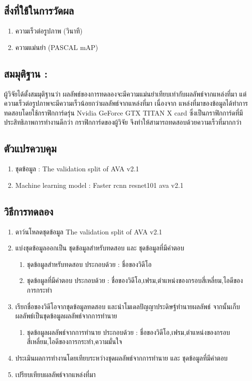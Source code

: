 \subsection*{สิ่งที่ใช้ในการวัดผล}
	\begin{enumerate}
		\item ความเร็วต่อรูปภาพ (วินาที)
		\item ความแม่นยำ (PASCAL mAP)
	\end{enumerate}
\subsection*{สมมุติฐาน :}ผู้วิจัยได้ตั้งสมมุติฐานว่า ผลลัพธ์ของการทดลองจะมีความแม่นยำเทียบเท่ากับผลลัพธ์จากแหล่งที่มา แต่ความเร็วต่อรูปภาพจะมีความเร็วน้อยกว่าผลลัพธ์จากแหล่งที่มา เนื่องจาก แหล่งที่มาของข้อมูลได้ทำการทดสอบโดยใช้กราฟิกการ์ดรุ่น Nvidia GeForce GTX TITAN X card ซึ่งเป็นกราฟิกการ์ดที่มีประสิทธิภาพการทำงานดีกว่า กราฟิกการ์ดของผู้วิจัย จึงทำให้สามารถทดสอบด้วยความเร็วที่มากกว่า
\subsection*{ตัวแปรควบคุม}
	\begin{enumerate}
		\item ชุดข้อมูล : The validation split of AVA v2.1
		\item Machine learning model : Faster rcnn resnet101 ava v2.1
	\end{enumerate}
\subsection*{วิธีการทดลอง}
	\begin{enumerate}
		\item ดาว์นโหลดชุดข้อมูล The validation split of AVA v2.1
		\item แบ่งชุดข้อมูลออกเป็น ชุดข้อมูลสำหรับทดสอบ และ ชุดข้อมูลที่มีคำตอบ
			\begin{enumerate}
				\item ชุดข้อมูลสำหรับทดสอบ ประกอบด้วย : ชื่อของวิดีโอ
				\item ชุดข้อมูลที่มีคำตอบ ประกอบด้วย : ชื่อของวิดีโอ,เฟรม,ตำแหน่งของกรอบสี่เหลี่ยม,ไอดีของการกระทำ
			\end{enumerate}
		\item เรียกชื่อของวิดีโอจากชุดข้อมูลทดสอบ และนำโมเดลปัญญาประดิษฐ์ทำนายผลลัพธ์ จากนั้นเก็บผลลัพธ์เป็นชุดข้อมูลผลลัพธ์จากการทำนาย
			\begin{enumerate}
				\item ชุดข้อมูลผลลัพธ์จากการทำนาย ประกอบด้วย : ชื่อของวิดีโอ,เฟรม,ตำแหน่งของกรอบสี่เหลี่ยม,ไอดีของการกระทำ,ความมั่นใจ
			\end{enumerate}
		\item ประเมินผลการทำงานโดยเทียบระหว่างชุดผลลัพธ์จากการทำนาย และ ชุดข้อมูลที่มีคำตอบ
		\item เปรียบเทียบผลลัพธ์จากแหล่งที่มา
\end{enumerate}
\clearpage
